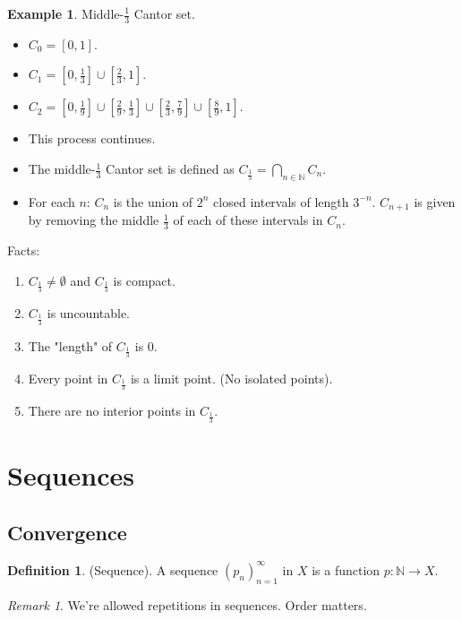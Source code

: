 \documentclass[10pt]{article}
\newcommand{\N}{\mathbb{N}}
\theoremstyle{definition}
\newtheorem{definition}[theorem]{Definition}
\newtheorem{example}[theorem]{Example}
\theoremstyle{remark}
\newtheorem*{remark}{Remark}
\begin{document}
\begin{example}
    Middle-$\frac{1}{3}$ Cantor set.
    \begin{itemize}
        \item $C_0 = [0, 1]$.
        \item $C_1 = \left[0, \frac{1}{3}\right] \cup \left[\frac{2}{3}, 1\right]$.
        \item $C_2 = \left[0, \frac{1}{9}\right] \cup \left[\frac{2}{9}, \frac{1}{3}\right] \cup \left[\frac{2}{3}, \frac{7}{9}\right] \cup \left[\frac{8}{9}, 1\right]$.
        \item This process continues.
        \item The middle-$\frac{1}{3}$ Cantor set is defined as $C_{\frac{1}{3}} = \bigcap_{n \in \N} C_n$.
        \item For each $n$: $C_n$ is the union of $2^n$ closed intervals of length $3^{-n}$.
            $C_{n+1}$ is given by removing the middle $\frac{1}{3}$ of each of these intervals in $C_n$.
    \end{itemize}
    Facts:
    \begin{enumerate}
        \item $C_{\frac{1}{3}} \neq \emptyset$ and $C_{\frac{1}{3}}$ is compact.
        \item $C_{\frac{1}{3}}$ is uncountable. 
        \item The "length" of $C_{\frac{1}{3}}$ is 0.
        \item Every point in $C_{\frac{1}{3}}$ is a limit point. (No isolated points).
        \item There are no interior points in $C_{\frac{1}{3}}$.
    \end{enumerate}
\end{example}

\newpage

\section{Sequences}

\subsection{Convergence}
\begin{definition}
    (Sequence).
    A sequence $(p_n)_{n = 1}^\infty$ in $X$ is a function $p \colon \N \to X$.
\end{definition}

\begin{remark}
    We're allowed repetitions in sequences. Order matters.
\end{remark}
\end{document}
